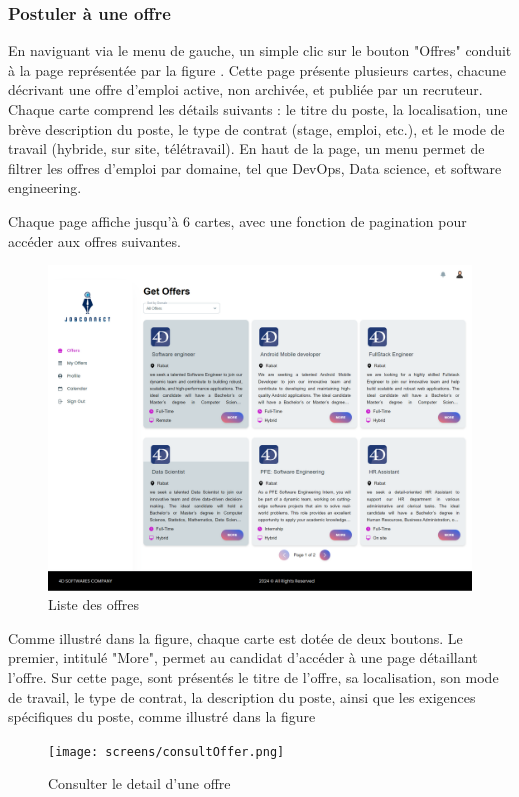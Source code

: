 \vspace{6cm}

\subsubsection{Postuler à une offre}
En naviguant via le menu de gauche, un simple clic sur le bouton "Offres" conduit à la page représentée par la figure .  Cette  page  présente plusieurs cartes, chacune décrivant une  offre d'emploi active, non  archivée, et  publiée par un recruteur. Chaque carte comprend les détails suivants : le titre du poste, la localisation, une brève description du poste, le  type de  contrat (stage, emploi, etc.), et le mode de travail (hybride, sur site, télétravail). En haut de la page, un menu permet de filtrer les offres d'emploi par domaine, tel que DevOps, Data science, et software engineering.
\newline

Chaque page affiche jusqu'à 6 cartes,  avec  une  fonction  de  pagination pour accéder aux offres suivantes.
\begin{figure}[htbp]
   \centering
   \includegraphics[scale=0.2]{screens/Offfers.png} 
   \caption{Liste des offres}
   \label{fig:listOffers}
\end{figure}

Comme illustré dans la figure, chaque carte est dotée de deux boutons. Le premier, intitulé "More", permet au candidat d'accéder à une page détaillant l'offre. Sur cette page, sont présentés  le  titre  de  l'offre,  sa  localisation,  son mode de travail, le type de contrat, la description du  poste,  ainsi  que  les exigences spécifiques du poste, comme illustré dans la figure
\newline
\begin{figure}[htb]
   \centering
   \texttt{[image: screens/consultOffer.png]} 
   \caption{Consulter le detail d'une offre}
   \label{fig:detailsOffre}
\end{figure}
\vspace{3cm}

